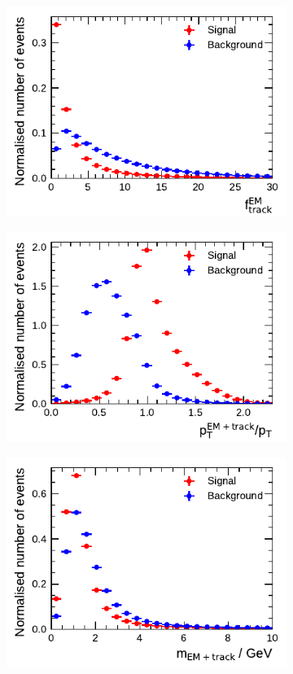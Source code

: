 \begin{figure}[htbp]\ContinuedFloat
  \begin{subfigure}{0.5\textwidth}
    \centering
    \includegraphics{./figures/baseline_bdt_vars/1p/EMPOverTrkSysP.pdf}
  \end{subfigure}%
  \begin{subfigure}{0.5\textwidth}
    \centering
    \includegraphics{./figures/baseline_bdt_vars/1p/ptRatioEflowApprox.pdf}
  \end{subfigure}
  \begin{subfigure}{0.5\textwidth}
    \centering
    \includegraphics{./figures/baseline_bdt_vars/1p/mEflowApprox.pdf}

\end{subfigure}
\end{figure}
